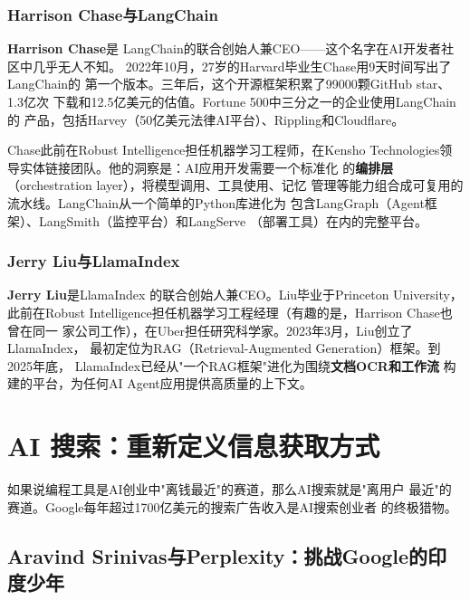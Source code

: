 \subsubsection{Harrison Chase与LangChain} \textbf{Harrison Chase}是
LangChain的联合创始人兼CEO——这个名字在AI开发者社区中几乎无人不知。
2022年10月，27岁的Harvard毕业生Chase用9天时间写出了LangChain的
第一个版本。三年后，这个开源框架积累了99000颗GitHub star、1.3亿次
下载和12.5亿美元的估值。Fortune 500中三分之一的企业使用LangChain的
产品，包括Harvey（50亿美元法律AI平台）、Rippling和Cloudflare。

Chase此前在Robust Intelligence担任机器学习工程师，在Kensho
Technologies领导实体链接团队。他的洞察是：AI应用开发需要一个标准化
的\textbf{编排层}（orchestration layer），将模型调用、工具使用、记忆
管理等能力组合成可复用的流水线。LangChain从一个简单的Python库进化为
包含LangGraph（Agent框架）、LangSmith（监控平台）和LangServe
（部署工具）在内的完整平台。

\subsubsection{Jerry Liu与LlamaIndex} \textbf{Jerry Liu}是LlamaIndex
的联合创始人兼CEO。Liu毕业于Princeton University，此前在Robust
Intelligence担任机器学习工程经理（有趣的是，Harrison Chase也曾在同一
家公司工作），在Uber担任研究科学家。2023年3月，Liu创立了LlamaIndex，
最初定位为RAG（Retrieval-Augmented Generation）框架。到2025年底，
LlamaIndex已经从"一个RAG框架"进化为围绕\textbf{文档OCR和工作流}
构建的平台，为任何AI Agent应用提供高质量的上下文。


\section{AI 搜索：重新定义信息获取方式}
\label{sec:founders-search}

如果说编程工具是AI创业中"离钱最近"的赛道，那么AI搜索就是"离用户
最近"的赛道。Google每年超过1700亿美元的搜索广告收入是AI搜索创业者
的终极猎物。

\subsection{Aravind Srinivas与Perplexity：挑战Google的印度少年}
\label{subsec:founders-perplexity}

